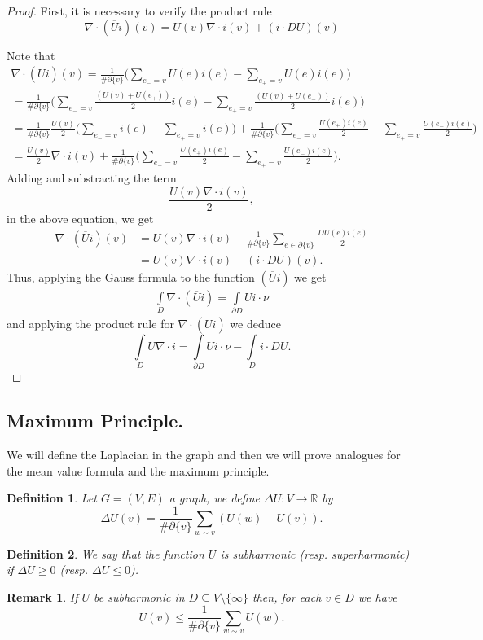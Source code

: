 \documentclass{article}
\newtheorem{remark}{Remark}
\newtheorem{definition}{Definition}
\begin{document}
\begin{proof}
	First, it is necessary to verify the product rule
	\[
	  \nabla\cdot (\overline{U}i)(v)=U(v)\nabla\cdot i(v)+(i\cdot DU)(v)
	\]
	
	Note that
\begin{gather*}
     \nabla\cdot(\overline{U}i)(v)=\frac{1}{\# \partial \{ v \}}\bigg( \sum \limits_{e_-=v}\overline{U}(e)i(e)- \sum \limits_{e_+=v} \overline{U}(e)i(e)\bigg) \\
=\frac{1}{\#\partial \{v\}}\bigg(\sum \limits_{e_-=v}\frac{(U(v)+U(e_+))}{2}i(e)-\sum \limits_{e_+=v}\frac{(U(v)+U(e_-))}{2}i(e)\bigg)\\
 =\frac{1}{\#\partial \{v\}}\frac{U(v)}{2}\bigg(\sum \limits_{e_-=v}i(e)-\sum \limits_{e_+=v}i(e)\bigg)+\frac{1}{\#\partial \{v\}}\bigg(\sum \limits_{e_-=v}\frac{U(e_+)i(e)}{2}-\sum \limits_{e_+=v}\frac{U(e_-)i(e)}{2}\bigg)\\
 =\frac{U(v)}{2}\nabla\cdot i(v)+\frac{1}{\#\partial \{v\}}\bigg(\sum \limits_{e_-=v}\frac{U(e_+)i(e)}{2}-\sum \limits_{e_+=v}\frac{U(e_-)i(e)}{2}\bigg).
\end{gather*}
Adding and substracting the term
\[
  \frac{U(v)\nabla\cdot i(v)}{2},
\]
in the above equation, we get
\begin{align*}
\nabla\cdot(\overline{U}i)(v)&=U(v)\nabla\cdot i(v)+\frac{1}{\#\partial \{v\}}\sum \limits_{e\in \partial \{v\}}\frac{DU(e)i(e)}{2}\\
&=U(v)\nabla\cdot i(v)+(i\cdot DU)(v).
\end{align*}
Thus, applying the Gauss formula to the function $(\overline{U}i)$ we get
\begin{align*}
\int \limits_{D}\nabla\cdot (\overline{U}i)=\int \limits_{\partial D}Ui\cdot \nu
\end{align*}
and applying the product rule for $\nabla \cdot (\overline{U}i)$ we deduce
\[
  \int \limits_{D}U\nabla\cdot i=\int \limits_{\partial D} \overline{U} i\cdot \nu-\int \limits_{D}i\cdot DU.
\]
\end{proof}

\subsection{Maximum Principle.}

We will define the Laplacian in the graph and then we will prove analogues for  the mean value formula and the maximum principle.
\begin{definition}
	Let $G=(V,E)$ a graph, we define $\Delta U:V\rightarrow \mathbb{R}$ by
	\[
	  \Delta U(v)=\frac{1}{\#\partial \{v\}}\sum \limits_{w\sim v}(U(w)-U(v)).
	\]
	
	
\end{definition}
\begin{definition}
	We say that the function $U$ is subharmonic (resp. superharmonic) if $\Delta U\geq 0$ (resp. $\Delta U\leq 0$).
\end{definition}
\begin{remark}
	If $U$ be subharmonic in $D\subseteq V\setminus\{\infty\}$ then, for each $v\in D$ we have
	\[
	  U(v)\leq \frac{1}{\#\partial \{v\}}\sum \limits_{w\sim v}U(w).
	\]
\end{remark}
\end{document}
